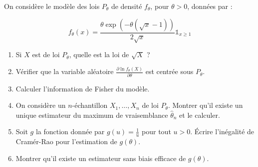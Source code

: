 \begin{mdframed}
\begin{exercice}
On considère le modèle des lois $P_\theta$ de densité $f_\theta$, pour $\theta > 0$, données par :

$$
f_\theta(x) = \frac{\theta \exp\left(-\theta(\sqrt{x} - 1)\right)}{2\sqrt{x}} \mathbb{1}_{x \ge 1} 
$$

\begin{enumerate}
    \item Si $X$ est de loi $P_\theta$, quelle est la loi de $\sqrt{X}$ ?
    \item Vérifier que la variable aléatoire $\frac{\partial \ln f_\theta(X)}{\partial \theta}$ est centrée sous $P_\theta$.
    \item Calculer l'information de Fisher du modèle.
    \item On considère un $n$-échantillon $X_1, \dots, X_n$ de loi $P_\theta$. Montrer qu'il existe un unique estimateur du maximum de vraisemblance $\hat{\theta}_n$ et le calculer.
    \item Soit $g$ la fonction donnée par $g(u) = \frac{1}{u}$ pour tout $u > 0$. Écrire l'inégalité de Cramér-Rao pour l'estimation de $g(\theta)$.
    \item Montrer qu'il existe un estimateur sans biais efficace de $g(\theta)$.
\end{enumerate}
\end{exercice}
\end{mdframed}